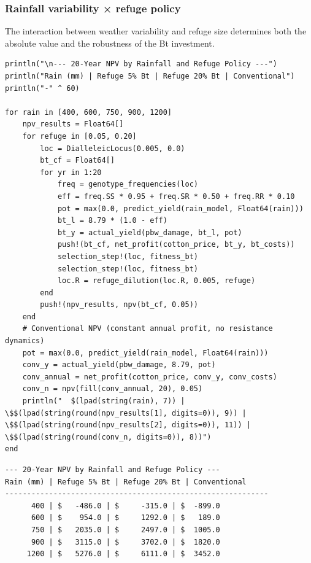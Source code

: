 \subsubsection{Rainfall variability × refuge policy}



\label{842745552457976517}{}


The interaction between weather variability and refuge size determines both the absolute value and the robustness of the Bt investment.




\begin{verbatim}
println("\n--- 20-Year NPV by Rainfall and Refuge Policy ---")
println("Rain (mm) | Refuge 5% Bt | Refuge 20% Bt | Conventional")
println("-" ^ 60)

for rain in [400, 600, 750, 900, 1200]
    npv_results = Float64[]
    for refuge in [0.05, 0.20]
        loc = DialleleicLocus(0.005, 0.0)
        bt_cf = Float64[]
        for yr in 1:20
            freq = genotype_frequencies(loc)
            eff = freq.SS * 0.95 + freq.SR * 0.50 + freq.RR * 0.10
            pot = max(0.0, predict_yield(rain_model, Float64(rain)))
            bt_l = 8.79 * (1.0 - eff)
            bt_y = actual_yield(pbw_damage, bt_l, pot)
            push!(bt_cf, net_profit(cotton_price, bt_y, bt_costs))
            selection_step!(loc, fitness_bt)
            selection_step!(loc, fitness_bt)
            loc.R = refuge_dilution(loc.R, 0.005, refuge)
        end
        push!(npv_results, npv(bt_cf, 0.05))
    end
    # Conventional NPV (constant annual profit, no resistance dynamics)
    pot = max(0.0, predict_yield(rain_model, Float64(rain)))
    conv_y = actual_yield(pbw_damage, 8.79, pot)
    conv_annual = net_profit(cotton_price, conv_y, conv_costs)
    conv_n = npv(fill(conv_annual, 20), 0.05)
    println("  $(lpad(string(rain), 7)) | \$$(lpad(string(round(npv_results[1], digits=0)), 9)) | \$$(lpad(string(round(npv_results[2], digits=0)), 11)) | \$$(lpad(string(round(conv_n, digits=0)), 8))")
end
\end{verbatim}




\begin{verbatim}
--- 20-Year NPV by Rainfall and Refuge Policy ---
Rain (mm) | Refuge 5% Bt | Refuge 20% Bt | Conventional
------------------------------------------------------------
      400 | $   -486.0 | $     -315.0 | $  -899.0
      600 | $    954.0 | $     1292.0 | $   189.0
      750 | $   2035.0 | $     2497.0 | $  1005.0
      900 | $   3115.0 | $     3702.0 | $  1820.0
     1200 | $   5276.0 | $     6111.0 | $  3452.0
\end{verbatim}



